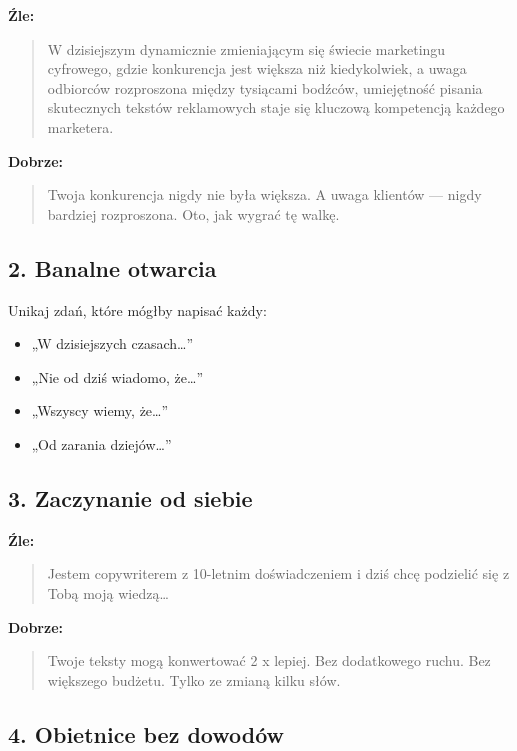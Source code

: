 \documentclass[
  12pt,
  a4paper,
  twoside,
  openright,
  12pt,
  DIV=12,
  BCOR=12mm]{scrbook}
\providecommand{\tightlist}{%
  \setlength{\itemsep}{0pt}\setlength{\parskip}{0pt}}\usepackage{longtable,booktabs,array}
\begin{document}
\textbf{Źle:}

\begin{quote}
W dzisiejszym dynamicznie zmieniającym się świecie marketingu cyfrowego,
gdzie konkurencja jest większa niż kiedykolwiek, a uwaga odbiorców
rozproszona między tysiącami bodźców, umiejętność pisania skutecznych
tekstów reklamowych staje się kluczową kompetencją każdego marketera.
\end{quote}

\textbf{Dobrze:}

\begin{quote}
Twoja konkurencja nigdy nie była większa. A uwaga klientów --- nigdy
bardziej rozproszona. Oto, jak wygrać tę walkę.
\end{quote}

\subsection{2. Banalne otwarcia}\label{banalne-otwarcia}

Unikaj zdań, które mógłby napisać każdy:

\begin{itemize}
\tightlist
\item
  „W dzisiejszych czasach\ldots''
\item
  „Nie od dziś wiadomo, że\ldots''
\item
  „Wszyscy wiemy, że\ldots''
\item
  „Od zarania dziejów\ldots''
\end{itemize}

\subsection{3. Zaczynanie od siebie}\label{zaczynanie-od-siebie}

\textbf{Źle:}

\begin{quote}
Jestem copywriterem z 10-letnim doświadczeniem i dziś chcę podzielić się
z Tobą moją wiedzą\ldots{}
\end{quote}

\textbf{Dobrze:}

\begin{quote}
Twoje teksty mogą konwertować 2 x lepiej. Bez dodatkowego ruchu. Bez
większego budżetu. Tylko ze zmianą kilku słów.
\end{quote}

\subsection{4. Obietnice bez dowodów}\label{obietnice-bez-dowoduxf3w}
\end{document}
